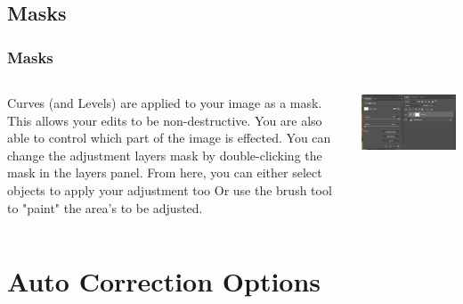 \documentclass{beamer}
\begin{document}
			\subsection{Masks}		
			\begin{frame}
				\frametitle{Masks}
				\begin{columns}
					\begin{outline}
						\1 Curves (and Levels) are applied to your image as a mask.
						\1 This allows your edits to be non-destructive.
						\1 You are also able to control which part of the image is effected.
						\1 You can change the adjustment layers mask by double-clicking the mask in the layers panel.
						\2 From here, you can either select objects to apply your adjustment too
						\2 Or use the brush tool to "paint" the area's to be adjusted.
					\end{outline}
					\includegraphics[width=1.0\textwidth]{images/curves mask.png}
				\end{columns}
			\end{frame}
			
			
			
			
		\section{Auto Correction Options}
\end{document}
